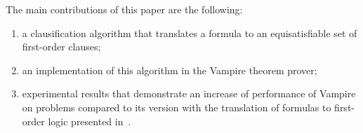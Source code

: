 The main contributions of this paper are the following:
\begin{enumerate}
  \item a clausification algorithm that translates a \folb{} formula to an equisatisfiable set of first-order clauses;
  \item an implementation of this algorithm in the Vampire theorem prover;
  \item experimental results that demonstrate an increase of performance of Vampire on \folb{} problems compared to its version with the translation of \folb{} formulas to first-order logic presented in~\cite{FOOL}.
\end{enumerate}